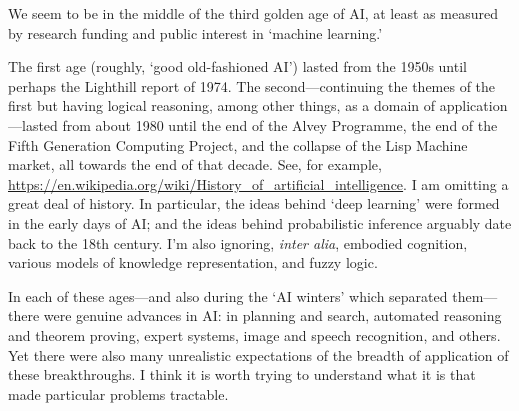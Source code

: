 \documentclass[10pt, a4, twocolumn]{article}
\begin{document}
We seem to be in the middle of the third golden age of AI, at least as measured
by research funding and public interest in `machine learning.'

The first age (roughly, `good old-fashioned AI') lasted from the 1950s until
perhaps the Lighthill report of 1974. The second---continuing the themes of the
first but having logical reasoning, among other things, as a domain of
application---lasted from about 1980 until the end of the Alvey Programme, the end
of the Fifth Generation Computing Project, and the collapse of the Lisp Machine
market, all towards the end of that decade. See, for example,
\url{https://en.wikipedia.org/wiki/History_of_artificial_intelligence}. I am
omitting a great deal of history. In particular, the ideas behind `deep
learning' were formed in the early days of AI; and the ideas behind
probabilistic inference arguably date back to the 18th century. I'm also
ignoring, \emph{inter alia}, embodied cognition, various models of knowledge
representation, and fuzzy logic.

In each of these ages---and also during the `AI winters' which separated
them---there were genuine advances in AI: in planning and search, automated
reasoning and theorem proving, expert systems, image and speech recognition, and
others. Yet there were also many unrealistic expectations of the breadth of
application of these breakthroughs. I think it is worth trying to understand
what it is that made particular problems tractable.
\end{document}
